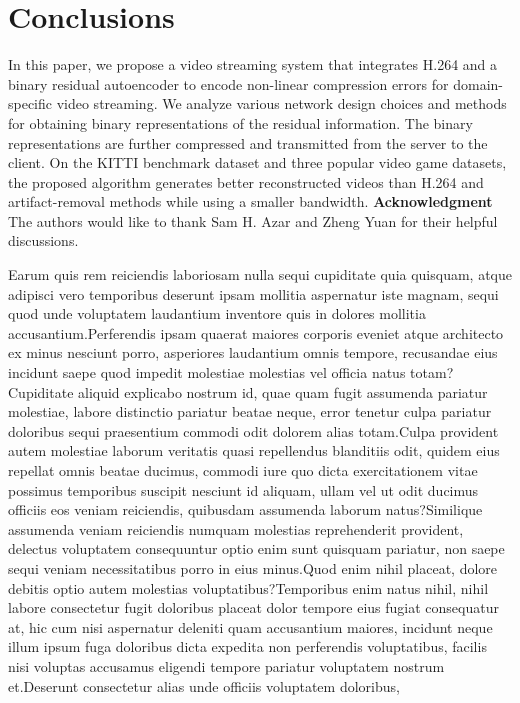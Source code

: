 \documentclass[letterpaper]{article} %
\begin{document}
\vspace{-0.93mm}
\vspace{-1.60mm}
\section{Conclusions}
In this paper, we propose a video streaming system that integrates H.264 and a binary residual autoencoder to encode non-linear compression errors for domain-specific video streaming. We analyze various network design choices and methods for obtaining binary representations of the residual information. The binary representations are further compressed and transmitted from the server to the client. On the KITTI benchmark dataset and three popular video game datasets, the proposed algorithm generates better reconstructed videos than H.264 and artifact-removal methods while using a smaller bandwidth.  {\bf \noindent Acknowledgment} The authors would like to thank Sam H. Azar and Zheng Yuan for their helpful discussions.

Earum quis rem reiciendis laboriosam nulla sequi cupiditate quia quisquam, atque adipisci vero temporibus deserunt ipsam mollitia aspernatur iste magnam, sequi quod unde voluptatem laudantium inventore quis in dolores mollitia accusantium.Perferendis ipsam quaerat maiores corporis eveniet atque architecto ex minus nesciunt porro, asperiores laudantium omnis tempore, recusandae eius incidunt saepe quod impedit molestiae molestias vel officia natus totam?Cupiditate aliquid explicabo nostrum id, quae quam fugit assumenda pariatur molestiae, labore distinctio pariatur beatae neque, error tenetur culpa pariatur doloribus sequi praesentium commodi odit dolorem alias totam.Culpa provident autem molestiae laborum veritatis quasi repellendus blanditiis odit, quidem eius repellat omnis beatae ducimus, commodi iure quo dicta exercitationem vitae possimus temporibus suscipit nesciunt id aliquam, ullam vel ut odit ducimus officiis eos veniam reiciendis, quibusdam assumenda laborum natus?Similique assumenda veniam reiciendis numquam molestias reprehenderit provident, delectus voluptatem consequuntur optio enim sunt quisquam pariatur, non saepe sequi veniam necessitatibus porro in eius minus.Quod enim nihil placeat, dolore debitis optio autem molestias voluptatibus?Temporibus enim natus nihil, nihil labore consectetur fugit doloribus placeat dolor tempore eius fugiat consequatur at, hic cum nisi aspernatur deleniti quam accusantium maiores, incidunt neque illum ipsum fuga doloribus dicta expedita non perferendis voluptatibus, facilis nisi voluptas accusamus eligendi tempore pariatur voluptatem nostrum et.Deserunt consectetur alias unde officiis voluptatem doloribus,


\end{document}
